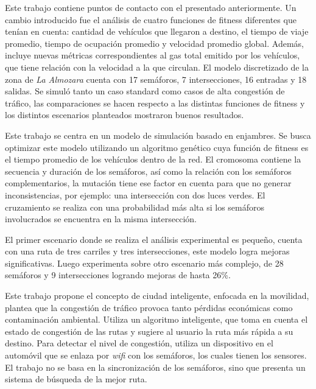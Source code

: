 \begin{itemize}
\begin{item}
\end{item}

\begin{item}

Este trabajo contiene  puntos de contacto con el presentado anteriormente. Un cambio introducido fue el análisis de cuatro funciones de fitness diferentes que tenían en cuenta: cantidad de vehículos que llegaron a destino, el tiempo de viaje promedio, tiempo de ocupación promedio y velocidad promedio global. Además, incluye nuevas métricas correspondientes al gas total emitido por los vehículos, que tiene relación con la velocidad a la que circulan.
El modelo discretizado de la zona de \emph{La Almozara} cuenta con 17 semáforos, 7 intersecciones, 16 entradas y 18 salidas.
Se simuló tanto un caso standard como casos de alta congestión de tráfico, las comparaciones se hacen respecto a las distintas funciones de fitness y los distintos escenarios planteados mostraron buenos resultados.

\end{item}


\begin{item}

Este trabajo se centra en un modelo de simulación basado en enjambres. Se busca optimizar este modelo utilizando un algoritmo genético cuya función de fitness es el tiempo promedio de los vehículos dentro de la red. El cromosoma contiene la secuencia y duración de los semáforos, así como la relación con los semáforos complementarios, la mutación tiene ese factor en cuenta para que no generar inconsistencias, por ejemplo: una intersección con dos luces verdes. El cruzamiento se realiza con una probabilidad más alta si los semáforos involucrados se encuentra en la misma intersección.

El primer escenario donde se realiza el análisis experimental es pequeño, cuenta con una ruta de tres carriles y tres intersecciones, este modelo logra mejoras significativas. Luego experimenta sobre otro escenario más complejo, de 28 semáforos y 9 intersecciones logrando mejoras de hasta 26\%.
\end{item}	


\begin{item}

Este trabajo propone el concepto de ciudad inteligente, enfocada en la movilidad, plantea que la congestión de tráfico provoca tanto pérdidas económicas como contaminación ambiental. Utiliza un algoritmo inteligente, que toma en cuenta el estado de congestión de las rutas y sugiere al usuario la ruta más rápida a su destino. Para detectar el nivel de congestión, utiliza un dispositivo en el automóvil que se enlaza por \emph{wifi} con los semáforos, los cuales tienen los sensores. El trabajo no se basa en la sincronización de los semáforos, sino que presenta un sistema de búsqueda de la mejor ruta.


\end{item}
\end{itemize}
